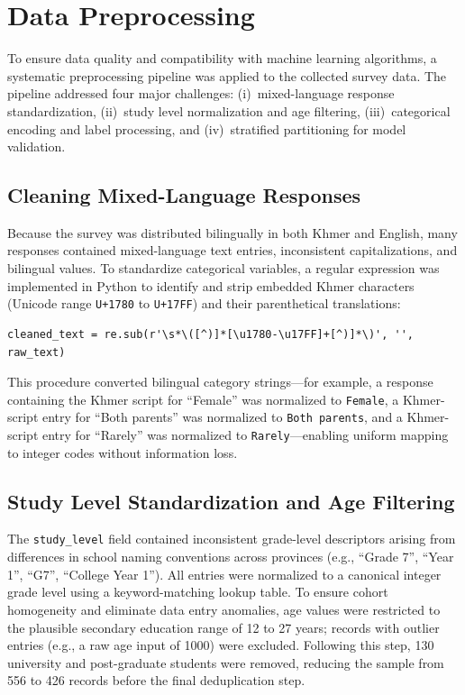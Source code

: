 \section{Data Preprocessing}
\label{sec:preprocessing}

To ensure data quality and compatibility with machine learning algorithms, a systematic preprocessing pipeline was applied to the collected survey data. The pipeline addressed four major challenges: (i)~mixed-language response standardization, (ii)~study level normalization and age filtering, (iii)~categorical encoding and label processing, and (iv)~stratified partitioning for model validation.

\subsection{Cleaning Mixed-Language Responses}
Because the survey was distributed bilingually in both Khmer and English, many responses contained mixed-language text entries, inconsistent capitalizations, and bilingual values. To standardize categorical variables, a regular expression was implemented in Python to identify and strip embedded Khmer characters (Unicode range \texttt{U+1780} to \texttt{U+17FF}) and their parenthetical translations:
\begin{verbatim}
cleaned_text = re.sub(r'\s*\([^)]*[\u1780-\u17FF]+[^)]*\)', '', raw_text)
\end{verbatim}
This procedure converted bilingual category strings---for example, a response containing the Khmer script for ``Female'' was normalized to \texttt{Female}, a Khmer-script entry for ``Both parents'' was normalized to \texttt{Both parents}, and a Khmer-script entry for ``Rarely'' was normalized to \texttt{Rarely}---enabling uniform mapping to integer codes without information loss.

\subsection{Study Level Standardization and Age Filtering}
The \texttt{study\_level} field contained inconsistent grade-level descriptors arising from differences in school naming conventions across provinces (e.g., ``Grade 7'', ``Year 1'', ``G7'', ``College Year 1''). All entries were normalized to a canonical integer grade level using a keyword-matching lookup table. To ensure cohort homogeneity and eliminate data entry anomalies, age values were restricted to the plausible secondary education range of 12 to 27 years; records with outlier entries (e.g., a raw age input of 1000) were excluded. Following this step, 130 university and post-graduate students were removed, reducing the sample from 556 to 426 records before the final deduplication step.

